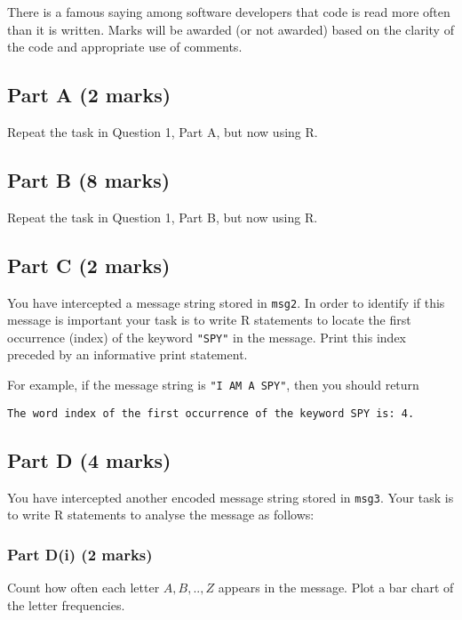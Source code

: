 \documentclass[
]{article}
\begin{document}
There is a famous saying among software developers that code is read
more often than it is written. Marks will be awarded (or not awarded)
based on the clarity of the code and appropriate use of comments.

\subsection{Part A (2 marks)}\label{part-a-2-marks}

Repeat the task in Question 1, Part A, but now using R.

\subsection{Part B (8 marks)}\label{part-b-8-marks}

Repeat the task in Question 1, Part B, but now using R.

\subsection{Part C (2 marks)}\label{part-c-2-marks}

You have intercepted a message string stored in \texttt{msg2}. In order
to identify if this message is important your task is to write R
statements to locate the first occurrence (index) of the keyword
\texttt{"SPY"} in the message. Print this index preceded by an
informative print statement.

For example, if the message string is \texttt{"I\ AM\ A\ SPY"}, then you
should return

\texttt{The\ word\ index\ of\ the\ first\ occurrence\ of\ the\ keyword\ SPY\ is:\ 4.}

\subsection{Part D (4 marks)}\label{part-d-4-marks}

You have intercepted another encoded message string stored in
\texttt{msg3}. Your task is to write R statements to analyse the message
as follows:

\subsubsection{Part D(i) (2 marks)}\label{part-di-2-marks}

Count how often each letter \(A,B,..,Z\) appears in the message. Plot a
bar chart of the letter frequencies.
\end{document}
